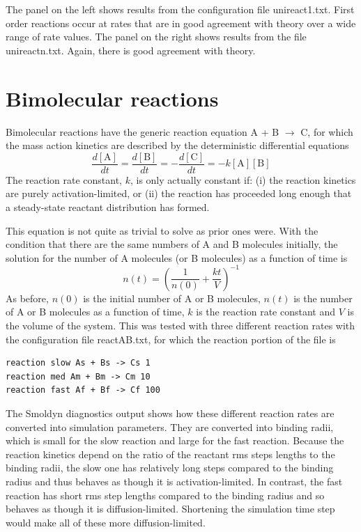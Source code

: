 \documentclass {book}
\begin{document}
The panel on the left shows results from the configuration file unireact1.txt. First order reactions occur at rates that are in good agreement with theory over a wide range of rate values. The panel on the right shows results from the file unireactn.txt. Again, there is good agreement with theory.

\section{Bimolecular reactions}

Bimolecular reactions have the generic reaction equation A + B $\rightarrow$ C, for which the mass action kinetics are described by the deterministic differential equations
$$\frac{d[\textrm{A}]}{dt} = \frac{d[\textrm{B}]}{dt} = -\frac{d[\textrm{C}]}{dt} = -k [\textrm{A}] [\textrm{B}]$$
The reaction rate constant, $k$, is only actually constant if: (i) the reaction kinetics are purely activation-limited, or (ii) the reaction has proceeded long enough that a steady-state reactant distribution has formed.

This equation is not quite as trivial to solve as prior ones were. With the condition that there are the same numbers of A and B molecules initially, the solution for the number of A molecules (or B molecules) as a function of time is
$$n(t) = \left(\frac{1}{n(0)} + \frac{kt}{V} \right)^{-1}$$
As before, $n(0)$ is the initial number of A or B molecules, $n(t)$ is the number of A or B molecules as a function of time, $k$ is the reaction rate constant and $V$ is the volume of the system. This was tested with three different reaction rates with the configuration file reactAB.txt, for which the reaction portion of the file is

\begin{lstlisting}[style=SSAC]
reaction slow As + Bs -> Cs 1
reaction med Am + Bm -> Cm 10
reaction fast Af + Bf -> Cf 100
\end{lstlisting}
The Smoldyn diagnostics output shows how these different reaction rates are converted into simulation parameters. They are converted into binding radii, which is small for the slow reaction and large for the fast reaction. Because the reaction kinetics depend on the ratio of the reactant rms steps lengths to the binding radii, the slow one has relatively long steps compared to the binding radius and thus behaves as though it is activation-limited. In contrast, the fast reaction has short rms step lengths compared to the binding radius and so behaves as though it is diffusion-limited. Shortening the simulation time step would make all of these more diffusion-limited.
\end{document}
